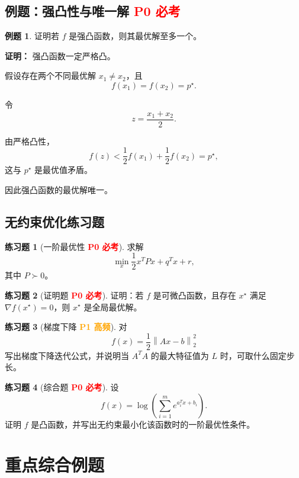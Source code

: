 \documentclass[11pt,a4paper]{ctexart}
\newcommand{\norm}[1]{\left\lVert #1 \right\rVert}
\newcommand{\Pzero}{\textcolor{red}{\textbf{P0 必考}}}
\newcommand{\Pone}{\textcolor{orange}{\textbf{P1 高频}}}
\theoremstyle{definition}
\newtheorem{example}{例题}[section]
\newtheorem{exercise}{练习题}[section]
\theoremstyle{plain}
\theoremstyle{remark}
\begin{document}
\subsection{例题：强凸性与唯一解 \Pzero}

\begin{example}
证明若 $f$ 是强凸函数，则其最优解至多一个。

\textbf{证明：}
强凸函数一定严格凸。

假设存在两个不同最优解 $x_1\neq x_2$，且
\[
    f(x_1)=f(x_2)=p^\star.
\]

令
\[
    z=\frac{x_1+x_2}{2}.
\]

由严格凸性，
\[
    f(z)
    <
    \frac12f(x_1)+\frac12f(x_2)
    =
    p^\star,
\]
这与 $p^\star$ 是最优值矛盾。

因此强凸函数的最优解唯一。
\end{example}

\subsection{无约束优化练习题}

\begin{exercise}[一阶最优性 \Pzero]
求解
\[
    \min_x
    \frac12x^TPx+q^Tx+r,
\]
其中 $P\succ0$。
\end{exercise}

\begin{exercise}[证明题 \Pzero]
证明：若 $f$ 是可微凸函数，且存在 $x^\star$ 满足 $\nabla f(x^\star)=0$，则 $x^\star$ 是全局最优解。
\end{exercise}

\begin{exercise}[梯度下降 \Pone]
对
\[
    f(x)=\frac12\norm{Ax-b}_2^2
\]
写出梯度下降迭代公式，并说明当 $A^TA$ 的最大特征值为 $L$ 时，可取什么固定步长。
\end{exercise}

\begin{exercise}[综合题 \Pzero]
设
\[
    f(x)=\log\left(\sum_{i=1}^m e^{a_i^Tx+b_i}\right).
\]
证明 $f$ 是凸函数，并写出无约束最小化该函数时的一阶最优性条件。
\end{exercise}

\newpage

\section{重点综合例题}
\end{document}
